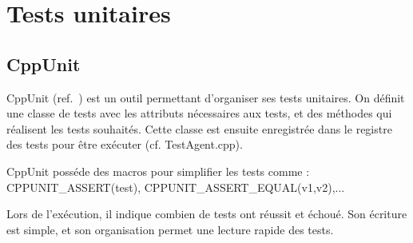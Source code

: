 \section{Tests unitaires}
\subsection{CppUnit}
CppUnit (ref.~\cite{CppUnit}) est un outil permettant d'organiser ses tests unitaires.
 On définit une classe de tests avec les attributs nécessaires aux tests, et des méthodes qui réalisent les tests souhaités. Cette classe est ensuite enregistrée dans le registre des tests pour être exécuter (cf. TestAgent.cpp).

CppUnit posséde des macros pour simplifier les tests comme :
CPPUNIT\_ASSERT(test), CPPUNIT\_ASSERT\_EQUAL(v1,v2),...

Lors de l'exécution, il indique combien de tests ont réussit et échoué.
Son écriture est simple, et son organisation permet une lecture rapide des tests.

